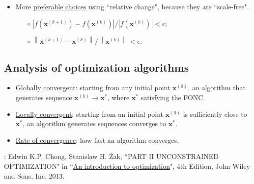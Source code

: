 \documentclass[12pt,thmsa]{article}
\begin{document}
\begin{itemize}
	\item More \underline{preferable choices} using ``relative change", because they are ``scale-free".
	\begin{itemize}
		\item[\(\circ\)]  \(\left|f\left(\boldsymbol{x}^{(k+1)}\right)-f\left(\boldsymbol{x}^{(k)}\right)\right| /\left|f\left(\boldsymbol{x}^{(k)}\right)\right|<\epsilon\);
		\item[\(\circ\)]  \(\left\|\boldsymbol{x}^{(k+1)}-\boldsymbol{x}^{(k)}\right\| /\left\|\boldsymbol{x}^{(k)}\right\|<\epsilon\).
	\end{itemize}
	
\end{itemize}


\subsection{Analysis of optimization algorithms}

\begin{itemize}
	\item \underline{Globally convergent}: starting from any initial point  \(\boldsymbol{x}^{(0)}\), an algorithm that generates sequence \(\boldsymbol{x}^{(k)} \rightarrow \boldsymbol{x}^{*}\), where \(\boldsymbol{x}^{*}\) satisfying the FONC.
	
	\item \underline{Locally convergent}: starting from an initial point \(\boldsymbol{x}^{(0)}\) is sufficiently close to \(\boldsymbol{x}^{*}\), an algorithm generates sequences converges to  \(\boldsymbol{x}^{*}\).
	
	\item \underline{Rate of convergence}: how fast an algorithm converges.
	
\end{itemize}

\bigskip

\noindent
[Ref]: Edwin K.P. Chong, Stanislaw H. Żak, ``PART II UNCONSTRAINED OPTIMIZATION" in ``\href{https://www.amazon.com/Introduction-Optimization-Edwin-K-Chong/dp/1118279018}{An introduction to optimization}", 4th Edition, John Wiley and Sons, Inc. 2013.
\end{document}
